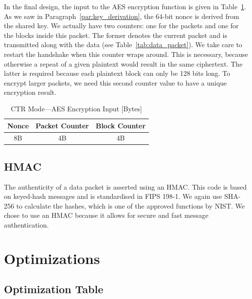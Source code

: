 \documentclass[a4paper]{article}
\begin{document}
In the final design, the input to the AES encryption function is given in Table~\ref{tab:ctr_mode_aes_encryption_input}. As we saw in Paragraph~\ref{par:key_derivation}, the 64-bit nonce is derived from the shared key. We actually have two counters: one for the packets and one for the blocks inside this packet. The former denotes the current packet and is transmitted along with the data (see Table~\ref{tab:data_packet}). We take care to restart the handshake when this counter wraps around. This is necessary, because otherwise a repeat of a given plaintext would result in the same ciphertext. The latter is required because each plaintext block can only be 128 bits long. To encrypt larger packets, we need this second counter value to have a unique encryption result.

\begin{table}[h]
    \begin{center}
        \begin{tabular}{| c | c | c |}
            \hline
            Nonce & Packet Counter & Block Counter \\ \hline
            8B & 4B & 4B \\
            \hline
        \end{tabular}
    \end{center}

    \caption{CTR Mode---AES Encryption Input [Bytes]}
    \label{tab:ctr_mode_aes_encryption_input}
\end{table}

\subsection{HMAC}

The authenticity of a data packet is asserted using an HMAC. This code is based on keyed-hash messages and is standardised in FIPS 198-1. We again use SHA-256 to calculate the hashes, which is one of the approved functions by NIST. We chose to use an HMAC because it allows for secure and fast message authentication.

\section{Optimizations}

\subsection{Optimization Table}
\end{document}
